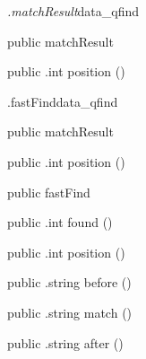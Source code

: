 \begin{CrexxClass}{\textit{.matchResult}}{data\_qfind}

  \begin{Hierarchy}
  \end{Hierarchy}

  \begin{Members}

    \Factory
      {public}
      {matchResult}
      {}

    \Method
      {public}
      {.int}
      {position}
      {()}

  \end{Members}
\end{CrexxClass}

\begin{CrexxClass}{.fastFind}{data\_qfind}

  \begin{Hierarchy}
  \end{Hierarchy}

  \begin{Members}

    \Factory
      {public}
      {matchResult}
      {}

    \Method
      {public}
      {.int}
      {position}
      {()}

    \Factory
      {public}
      {fastFind}
      {}

    \Method
      {public}
      {.int}
      {found}
      {()}

    \Method
      {public}
      {.int}
      {position}
      {()}

    \Method
      {public}
      {.string}
      {before}
      {()}

    \Method
      {public}
      {.string}
      {match}
      {()}

    \Method
      {public}
      {.string}
      {after}
      {()}

  \end{Members}
\end{CrexxClass}

